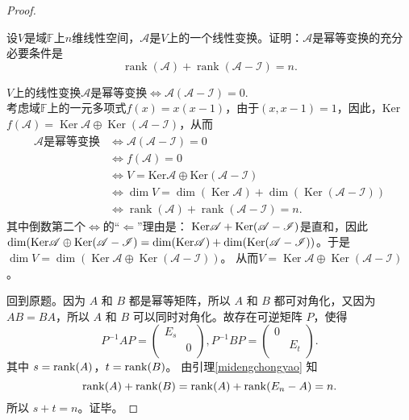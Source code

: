 \begin{enumerate}[1~]
\begin{proof}
\begin{lemma}\label{midengchongyao}
设$V$是域$\mathbb{F}$上$n$维线性空间，$\mathscr{A}$是$V$上的一个线性变换。证明：$\mathscr{A}$是幂等变换的充分必要条件是\[
\operatorname { rank } ( \mathscr { A } ) + \operatorname { rank } ( \mathscr { A } - \mathscr { I } ) = n.
\]
\end{lemma}
\begin{subproof}
$V$上的线性变换$\mathscr{A}$是幂等变换$\Longleftrightarrow \mathscr{A}(\mathscr{A}-\mathscr{I})=0$.\\
考虑域$\mathbb{F}$上的一元多项式$f(x)=x(x-1)$，由于$(x, x-1)=1$，因此，Ker $f ( \mathscr { A } ) = \operatorname { Ker } \mathscr { A } \oplus \operatorname { Ker } ( \mathscr { A } - \mathscr { I } )$，从而\begin{align*}
\text{$\mathscr{A}$是幂等变换}&\Longleftrightarrow
\mathscr{A}(\mathscr{A}-\mathscr{I})=0\\
&\Longleftrightarrow f(\mathscr{A})=0\\
&\Longleftrightarrow V = \mathrm { Ker } \mathscr { A } \oplus \mathrm { Ker } ( \mathscr { A } - \mathscr { I } )\\
&\Longleftrightarrow \operatorname { dim } V = \operatorname { dim } ( \operatorname { Ker } \mathscr { A } ) + \operatorname { dim } ( \operatorname { Ker } ( \mathscr { A } - \mathscr { I } ) )\\
&\Longleftrightarrow \operatorname { rank } ( \mathscr { A } ) + \operatorname { rank } ( \mathscr { A } - \mathscr { I } ) = n.
\end{align*}
其中倒数第二个$\Longleftrightarrow$的“$\Longleftarrow$”理由是： ${\rm Ker}\mathscr { A } + \operatorname { Ker } ( \mathscr { A } - \mathscr { I } )$是直和，因此$\dim({\rm Ker} \mathscr{A}\oplus \operatorname { Ker } ( \mathscr { A } - \mathscr { I } ) = \operatorname { dim } ( \mathrm { Ker } \mathscr { A } ) + \operatorname { dim } ( \operatorname { Ker } ( \mathscr { A } - \mathscr { I } ) )$。于是$\operatorname { dim } V = \operatorname { dim } ( \operatorname { Ker } \mathscr { A } \oplus \operatorname { Ker } ( \mathscr { A } - \mathscr { I } ) )$。
从而$V = \operatorname { Ker } \mathscr { A } \oplus \operatorname { Ker } ( \mathscr { A } - \mathscr { I } )$。
\end{subproof}

回到原题。因为 $A$ 和 $B$ 都是幂等矩阵，所以 $A$ 和 $B$ 都可对角化，又因为 $AB = BA$，所以 $A$ 和 $B$ 可以同时对角化。故存在可逆矩阵 $P$，使得\[
P ^ { - 1 } A P = \left( \begin{matrix}
	E_s&		\\
	&		0\\
\end{matrix} \right)  , 
P ^ { - 1 } B P = \left( \begin{matrix}
	0&		\\
	&		E_t\\
\end{matrix} \right) .
\]
其中 $s = {\rm rank}(A)$，$t = {\rm rank}(B)$。 由引理\ref{midengchongyao} 知\[
{\rm rank}(A) + {\rm rank}(B) = {\rm rank}(A) + {\rm rank}(E_n - A) = n.
\]
所以 $s + t = n$。证毕。
\end{proof}


\end{enumerate}
